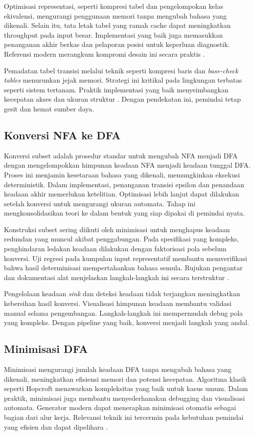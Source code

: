 \documentclass[../main.tex]{subfiles}
\begin{document}
Optimisasi representasi, seperti kompresi tabel dan pengelompokan kelas ekivalensi, mengurangi penggunaan memori tanpa mengubah bahasa yang dikenali. Selain itu, tata letak tabel yang ramah cache dapat meningkatkan throughput pada input besar. Implementasi yang baik juga memasukkan penanganan akhir berkas dan pelaporan posisi untuk keperluan diagnostik. Referensi modern merangkum kompromi desain ini secara praktis \citep{FlexManual,WikiDFA}.

Pemadatan tabel transisi melalui teknik seperti kompresi baris dan \emph{base-check tables} menurunkan jejak memori. Strategi ini kritikal pada lingkungan terbatas seperti sistem tertanam. Praktik implementasi yang baik menyeimbangkan kecepatan akses dan ukuran struktur \citep{WikiDFA}. Dengan pendekatan ini, pemindai tetap gesit dan hemat sumber daya.

\subsection{Konversi NFA ke DFA}
Konversi subset adalah prosedur standar untuk mengubah NFA menjadi DFA dengan mengelompokkan himpunan keadaan NFA menjadi keadaan tunggal DFA. Proses ini menjamin kesetaraan bahasa yang dikenali, memungkinkan eksekusi deterministik. Dalam implementasi, penanganan transisi epsilon dan penandaan keadaan akhir memerlukan ketelitian. Optimisasi lebih lanjut dapat dilakukan setelah konversi untuk mengurangi ukuran automata. Tahap ini mengkonsolidasikan teori ke dalam bentuk yang siap dipakai di pemindai nyata.

Konstruksi subset sering diikuti oleh minimisasi untuk menghapus keadaan redundan yang muncul akibat penggabungan. Pada spesifikasi yang kompleks, penghindaran ledakan keadaan dilakukan dengan faktorisasi pola sebelum konversi. Uji regresi pada kumpulan input representatif membantu memverifikasi bahwa hasil determinisasi mempertahankan bahasa semula. Rujukan pengantar dan dokumentasi alat menjelaskan langkah-langkah ini secara terstruktur \citep{WikiNFA,WikiDFA}.

Pengelolaan keadaan \emph{sink} dan deteksi keadaan tidak terjangkau meningkatkan kebersihan hasil konversi. Visualisasi himpunan keadaan membantu validasi manual selama pengembangan. Langkah-langkah ini mempermudah debug pola yang kompleks. Dengan pipeline yang baik, konversi menjadi langkah yang andal.

\subsection{Minimisasi DFA}
Minimisasi mengurangi jumlah keadaan DFA tanpa mengubah bahasa yang dikenali, meningkatkan efisiensi memori dan potensi kecepatan. Algoritma klasik seperti Hopcroft menawarkan kompleksitas yang baik untuk kasus umum. Dalam praktik, minimisasi juga membantu menyederhanakan debugging dan visualisasi automata. Generator modern dapat menerapkan minimisasi otomatis sebagai bagian dari alur kerja. Relevansi teknik ini tercermin pada kebutuhan pemindai yang efisien dan dapat dipelihara \citep{WikiDFAMin}.
\end{document}
